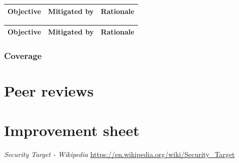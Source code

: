 \documentclass[10pt]{article}
\begin{document}

	\begin{center}
    \begin{tabular}{| l | l | c |}
      \hline
      \textbf{Objective} & \textbf{Mitigated by} & \textbf{Rationale} \\
      \hline
      
    \end{tabular}
	\end{center}

	\begin{center}
    \begin{tabular}{| l | l | c |}
      \hline
      \textbf{Objective} & \textbf{Mitigated by} & \textbf{Rationale} \\
      \hline
      
    \end{tabular}
	\end{center}

      \subsubsection{Coverage}
        

  \section{Peer reviews}

  \section{Improvement sheet}

  \begin{thebibliography}{9}
	 \textit{Security Target - Wikipedia} \url{https://en.wikipedia.org/wiki/Security_Target}
  \end{thebibliography}
\end{document}
